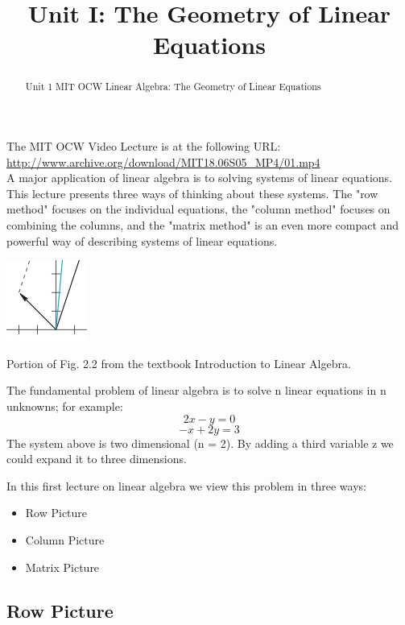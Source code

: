 \documentclass{ximera}
\title{Unit I: The Geometry of Linear Equations}
\begin{document}
\begin{abstract}
  Unit 1 MIT OCW Linear Algebra: The Geometry of Linear Equations
\end{abstract}\maketitle

\par

\noindent
The MIT OCW Video Lecture is at the following URL:\\
    \url{http://www.archive.org/download/MIT18.06S05_MP4/01.mp4}\\

\noindent
A major application of linear algebra is to solving systems of linear equations. This lecture presents three ways of thinking about these systems. The "row method" focuses on the individual equations, the "column method" focuses on combining the columns, and the "matrix method" is an even more compact and powerful way of describing systems of linear equations.

\par
\begin{center}
\includegraphics{1_1.jpg}

Portion of Fig. 2.2 from the textbook Introduction to Linear Algebra.
\end{center}

\noindent
The fundamental problem of linear algebra is to solve n linear equations in n unknowns; for example:
\[2x-y = 0\]
\[-x+2y = 3\]
The system above is two dimensional (n = 2). By adding a third variable z
we could expand it to three dimensions.

\noindent
In this first lecture on linear algebra we view this problem in three ways:

\begin{itemize}
\item Row Picture
\item Column Picture
\item Matrix Picture
\end{itemize}

\subsection*{Row Picture}
\end{document}
